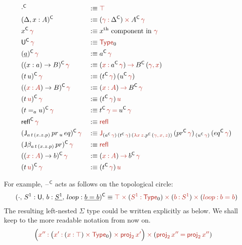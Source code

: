 \documentclass[a4paper,UKenglish]{lipics-v2018}
\newcommand{\U}{\mathsf{U}}
\newcommand{\ra}{\rightarrow}
\newcommand{\blank}{\mathord{\hspace{1pt}\text{--}\hspace{1pt}}} %
\newcommand{\C}{\mathsf{C}}
\newcommand{\proj}{\mathsf{proj}}
\newcommand{\refl}{\mathsf{refl}}
\newcommand{\1}{\mathsf{1}} \renewcommand{\Pr}{\mathsf{Pr}}
\renewcommand{\in}{\mathbin{\hat:}}
\renewcommand{\hat}[1]{{\color{BrickRed}{#1}}}
\newcommand{\rah}{\mathbin{\hat\ra}}
\newcommand{\commah}{\hat,\,}
\newcommand{\timesh}{\mathbin{\hat\times}}
\newcommand{\eqh}{\mathbin{\hat=}}
\newcommand{\Type}{\hat{\mathsf{Type}}}
\begin{document}
\begin{alignat*}{5}
  & \cdot^\C && :\equiv \hat{\top} \\
  & (\Delta,x:A)^\C && :\equiv (\hat{\gamma}\in\Delta^\C)\timesh A^\C\,\hat{\gamma} \\
  & x^\C\,\hat{\gamma} && :\equiv x^{\text{th}}\text{ component in } \hat{\gamma} \\ %
  & \U^\C\,\hat{\gamma} && :\equiv \Type_0 \\
  & (\underline{a})^\C\,\hat{\gamma} && :\equiv a^\C\,\hat{\gamma} \\
  & ((x:a)\ra B)^\C\,\hat{\gamma} && :\equiv (\hat{x}\in a^\C\,\hat{\gamma})\rah  B^\C\,(\hat{\gamma}\commah\hat{x}) \\
  & (t\,u)^\C\,\hat{\gamma} && :\equiv (t^\C\,\hat{\gamma})\,(u^\C\,\hat{\gamma}) \\
  & ((\hat{x}\in \hat{A})\ra B)^\C\,\hat{\gamma} && :\equiv (\hat{x}\in \hat{A})\rah  B^\C\,\hat{\gamma} \\
  & (t\,\hat{u})^\C\,\hat{\gamma} && :\equiv (t^\C\,\hat{\gamma})\,\hat{u} \\
  & (t=_a u)^\C\,\hat{\gamma} && :\equiv t^\C\,\hat{\gamma} \eqh u^\C\,\hat{\gamma} \\
  & \refl^\C\,\hat{\gamma} && :\equiv \hat{\refl} \\
  & (\J_{a\,t\,(x.z.p)}\,pr\,_u\,eq)^\C\,\hat{\gamma} && :\equiv \hat{\J}_{(a^\C\,\hat{\gamma})\,(t^\C\,\hat{\gamma})\,(\hat{\lambda} \hat{x}\,\hat{z}.p^\C\,(\hat{\gamma}\commah\hat{x}\commah\hat{z}))}\,(pr^\C\,\hat{\gamma})\,_{(u^\C\,\hat{\gamma})}\,(eq^\C\,\hat{\gamma}) \\
  & (\J\beta_{a\,t\,(x.z.p)}\,pr)^\C\,\hat{\gamma} && :\equiv \hat{\refl} \\
  & ((\hat{x}\in \hat{A})\ra b)^\C\,\hat{\gamma} && :\equiv (\hat{x}\in \hat{A})\rah  b^\C\,\hat{\gamma} \\
  & (t\,\hat{u})^\C\,\hat{\gamma} && :\equiv (t^\C\,\hat{\gamma})\,\hat{u}
\end{alignat*}\endgroup

For example, $\blank^\C$ acts as follows on the topological circle:
\begin{alignat*}{5}
  & && (\cdot,\,S^1 : \U,\,b:\underline{S^1},\,loop: \underline{b=b})^\C \equiv \hat{\top}\timesh(\hat{S^1}\in\Type_0)\timesh(\hat{b}\in \hat{S^1})\timesh(\hat{loop\in b=b})
\end{alignat*}
The resulting left-nested $\Sigma$ type could be written explicitly as below. We shall keep to the more readable notation from now on.
\begin{alignat*}{5}
  & \Big(\hat{x''}\in\big(\hat{x'}\in(\hat{x}\in\hat{\top})\timesh\Type_0\big)\timesh\hat{\proj_2}\,\hat{x'}\Big)\timesh(\hat{\proj_2}\,\hat{x''}\eqh \hat{\proj_2}\,\hat{x''})
\end{alignat*}
\end{document}
